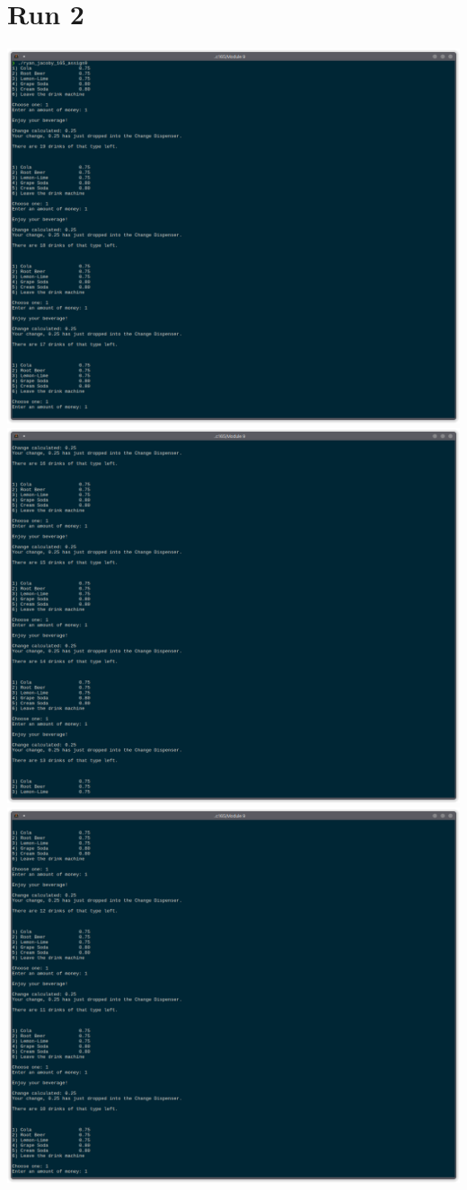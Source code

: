 \documentclass[letterpaper, 11pt]{article}
\begin{document}
\section*{Run 2}
\includegraphics[scale=0.5]{run2_1.png}
\clearpage
\includegraphics[scale=0.5]{run2_2.png}
\clearpage
\includegraphics[scale=0.5]{run2_3.png}
\end{document}
